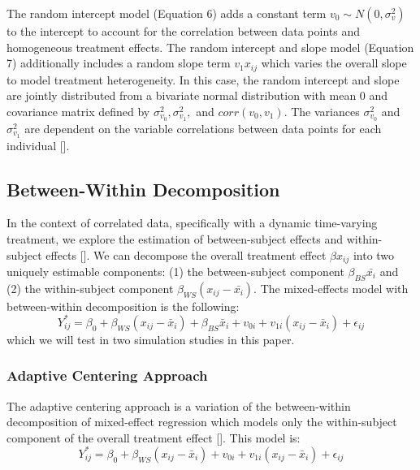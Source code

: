 \documentclass{article}
\begin{document}
    The random intercept model (Equation 6) adds a constant term $v_0 \sim N(0, \sigma^2_v)$ to the intercept to account for the correlation between data points and homogeneous treatment effects. The random intercept and slope model (Equation 7) additionally includes a random slope term $v_1x_{ij}$ which varies the overall slope to model treatment heterogeneity. In this case, the random intercept and slope are jointly distributed from a bivariate normal distribution with mean 0 and covariance matrix defined by $\sigma^2_{v_0}, \sigma^2_{v_1},$ and $corr(v_0, v_1)$. The variances $\sigma^2_{v_0}$ and $\sigma^2_{v_1}$ are dependent on the variable correlations between data points for each individual [\citealt{gibbons2006longitudinal}]. 
    
    \subsection{Between-Within Decomposition} 
    In the context of correlated data, specifically with a dynamic time-varying treatment, we explore the estimation of between-subject effects and within-subject effects [\citealt{10.2307/3109770}]. We can decompose the overall treatment effect $\beta x_{ij}$ into two uniquely estimable components: (1) the between-subject component $ \beta_{BS}\bar{x_i}$ and (2) the within-subject component $\beta_{WS}(x_{ij} - \bar{x_i})$. The mixed-effects model with between-within decomposition is the following: \begin{equation} Y_{ij}^* = \beta_0 + \beta_{WS}(x_{ij}-\bar{x}_i) + \beta_{BS}\bar{x}_i + v_{0i} + v_{1i}(x_{ij}-\bar{x}_i) + \epsilon_{ij} \end{equation} which we will test in two simulation studies in this paper. \\

    \subsubsection{Adaptive Centering Approach}
    \noindent The adaptive centering approach is a variation of the between-within decomposition of mixed-effect regression which models only the within-subject component of the overall treatment effect [\citealt{10.1162/edfp.2009.4.4.468}]. This model is: \begin{equation} Y_{ij}^* = \beta_0 + \beta_{WS}(x_{ij}-\bar{x}_i) + v_{0i} + v_{1i}(x_{ij}-\bar{x}_i) + \epsilon_{ij}\end{equation}
    
\end{document}
